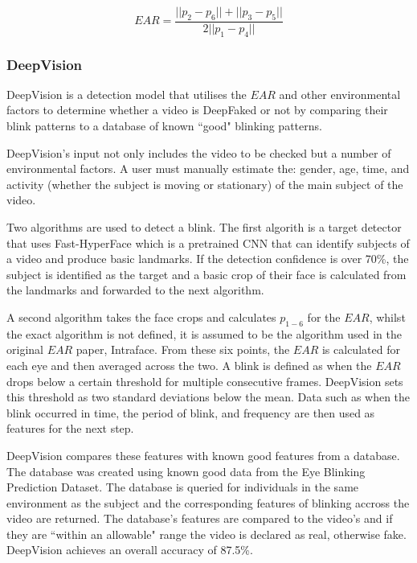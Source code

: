 \begin{equation}
    \label{eq:ear}
    EAR=\frac{||p_2-p_6|| + ||p_3-p_5||}{2||p_1-p_4||}
\end{equation}

\subsubsection{DeepVision}

DeepVision\cite{jung2020deepvision} is a detection model that utilises the $EAR$ and other environmental factors to determine whether a video is DeepFaked or not by comparing their blink patterns to a database of known ``good" blinking patterns.

DeepVision's input not only includes the video to be checked but a number of environmental factors. A user must manually estimate the: gender, age, time, and activity (whether the subject is moving or stationary) of the main subject of the video. 

Two algorithms are used to detect a blink. The first algorith is a target detector that uses Fast-HyperFace\cite{ranjan2017hyperface} which is a pretrained CNN that can identify subjects of a video and produce basic landmarks. If the detection confidence is over 70\%, the subject is identified as the target and a basic crop of their face is calculated from the landmarks and forwarded to the next algorithm.

A second algorithm takes the face crops and calculates $p_{1-6}$ for the $EAR$, whilst the exact algorithm is not defined, it is assumed to be the algorithm used in the original $EAR$ paper, Intraface\cite{xiong2013supervised}. From these six points, the $EAR$ is calculated for each eye and then averaged across the two. A blink is defined as when the $EAR$ drops below a certain threshold for multiple consecutive frames. DeepVision sets this threshold as two standard deviations below the mean. Data such as when the blink occurred in time, the period of blink, and frequency are then used as features for the next step.

DeepVision compares these features with known good features from a database. The database was created using known good data from the Eye Blinking Prediction Dataset\cite{turing2018eye}. The database is queried for individuals in the same environment as the subject and the corresponding features of blinking accross the video are returned. The database's features are compared to the video's and if they are ``within an allowable" range the video is declared as real, otherwise fake. DeepVision achieves an overall accuracy of 87.5\%.

